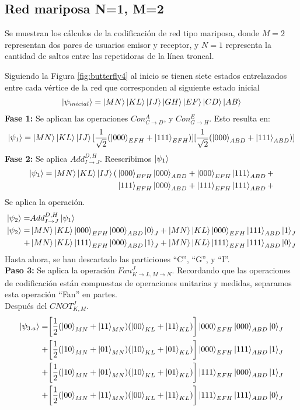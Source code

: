 \subsection{Red mariposa N=1, M=2}
Se muestran los cálculos de la codificación de red tipo mariposa, donde $M=2$ representan dos pares de usuarios emisor y receptor, y $N=1$ representa la cantidad de saltos entre las repetidoras de la línea troncal. \par
Siguiendo la Figura \ref{fig:butterfly4} al inicio se tienen siete estados entrelazados entre cada vértice de la red que corresponden al siguiente estado inicial
\begin{align*}
\ket{\psi_{inicial}} = \ket{MN}\ket{KL}\ket{IJ}\ket{GH}\ket{EF}\ket{CD}\ket{AB}
\end{align*}
\textbf{Fase 1:} Se aplican las operaciones $Con^{A}_{C \rightarrow D}$, y $Con^{E}_{G \rightarrow H}$. Esto resulta en:
\begin{align*}
\ket{\psi_{1}} = \ket{MN} \ket{KL} \ket{IJ} 
[\frac{1}{\sqrt{2}} (\ket{000}_{EFH} + \ket{111}_{EFH})] 
[\frac{1}{\sqrt{2}} (\ket{000}_{ABD} + \ket{111}_{ABD})] 
\end{align*}
\textbf{Fase 2:} Se aplica $ Add^{D,H}_{I \rightarrow J} $. Reescribimos $\ket{\psi_{1}}$
\begin{align*}
\ket{\psi_{1}}=\ket{MN}\ket{KL}\ket{IJ} ( 
& \ket{000}_{EFH}\ket{000}_{ABD} + \ket{000}_{EFH}\ket{111}_{ABD} + \\
& \ket{111}_{EFH}\ket{000}_{ABD} + \ket{111}_{EFH}\ket{111}_{ABD} + 
\end{align*}
Se aplica la operación.
\begin{align*}
\ket{\psi_{2}} =& Add^{D,H}_{I \rightarrow J}  \ket{\psi_{1}} \\
\ket{\psi_{2}} =& 
\ket{MN} \ket{KL} \ket{000}_{EFH}\ket{000}_{ABD}\ket{0}_J +\ket{MN}\ket{KL}\ket{000}_{EFH}\ket{111}_{ABD} \ket{1}_J \\
+& \ket{MN} \ket{KL} \ket{111}_{EFH}\ket{000}_{ABD}\ket{1}_J +\ket{MN}\ket{KL}\ket{111}_{EFH}\ket{111}_{ABD} \ket{0}_J
\end{align*}
Hasta ahora, se han descartado las particiones ``C'', ``G'', y ``I''. \\
\textbf{Paso 3:} Se aplica la operación $Fan^{J}_{K\rightarrow L, M\rightarrow N}$. Recordando que las operaciones de codificación están compuestas de operaciones unitarias y medidas, separamos esta operación ``Fan'' en partes. \\
Después del $CNOT^J_{K,M}$.
\begin{align*}
\ket{\psi_{3.a}} = & \qty[\frac{1}{2}(\ket{00}_{MN}+\ket{11}_{MN})(\ket{00}_{KL}+\ket{11}_{KL})]\ket{000}_{EFH}\ket{000}_{ABD}\ket{0}_{J} \\
                 + & \qty[\frac{1}{2}(\ket{10}_{MN}+\ket{01}_{MN})(\ket{10}_{KL}+\ket{01}_{KL})]\ket{000}_{EFH}\ket{111}_{ABD}\ket{1}_{J} \\
                 + & \qty[\frac{1}{2}(\ket{10}_{MN}+\ket{01}_{MN})(\ket{10}_{KL}+\ket{01}_{KL})]\ket{111}_{EFH}\ket{000}_{ABD}\ket{1}_{J} \\
                 + & \qty[\frac{1}{2}(\ket{00}_{MN}+\ket{11}_{MN})(\ket{00}_{KL}+\ket{11}_{KL})]\ket{111}_{EFH}\ket{111}_{ABD}\ket{0}_{J} 
\end{align*}
